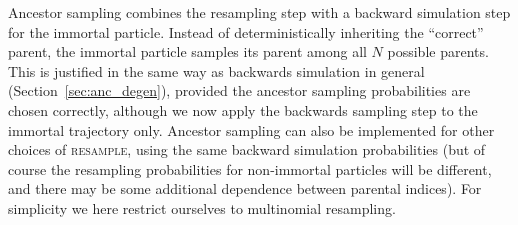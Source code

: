 Ancestor sampling combines the resampling step with a backward simulation step for the immortal particle. Instead of deterministically inheriting the ``correct'' parent, the immortal particle samples its parent among all $N$ possible parents.
This is justified in the same way as backwards simulation in general (Section~\ref{sec:anc_degen}), provided the ancestor sampling probabilities are chosen correctly, although we now apply the backwards sampling step to the immortal trajectory only.
Ancestor sampling can also be implemented for other choices of \textsc{resample}, using the same backward simulation probabilities (but of course the resampling probabilities for non-immortal particles will be different, and there may be some additional dependence between parental indices). For simplicity we here restrict ourselves to multinomial resampling.

